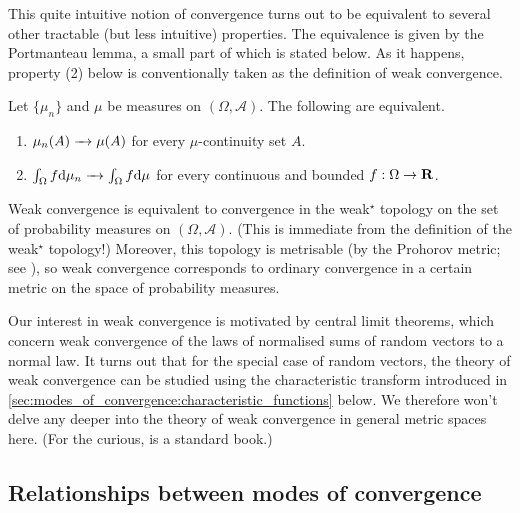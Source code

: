 \documentclass[11pt,letterpaper,reqno,oneside]{article}
\begin{document}
This quite intuitive notion of convergence turns out to be equivalent to several other tractable (but less intuitive) properties. The equivalence is given by the Portmanteau lemma, a small part of which is stated below. As it happens, property (2) below is conventionally taken as the definition of weak convergence.
%
\begin{lemma}
	\label{lemma:Portmanteau}
	Let $\{\mu_n\}$ and $\mu$ be measures on $(\Omega,\mathcal{A})$. The following are equivalent.
	\begin{enumerate}

		\item $\mu_n(A) \xrightarrow{\;\;\;} \mu(A)$ for every $\mu$-continuity set $A$.

		\item $\int_\Omega f \mathrm{d} \mu_n \xrightarrow{\;\;\;} \int_\Omega f \mathrm{d} \mu$ for every continuous and bounded $f : \Omega \to \mathbf{R}$.

	\end{enumerate}
\end{lemma}


Weak convergence is equivalent to convergence in the weak$^\star$ topology on the set of probability measures on $(\Omega,\mathcal{A})$. (This is immediate from the definition of the weak$^\star$ topology!) Moreover, this topology is metrisable (by the Prohorov metric; see \textcite[][pp. 72--3]{Billingsley1999}), so weak convergence corresponds to ordinary convergence in a certain metric on the space of probability measures.

Our interest in weak convergence is motivated by central limit theorems, which concern weak convergence of the laws of normalised sums of random vectors to a normal law. It turns out that for the special case of random vectors, the theory of weak convergence can be studied using the characteristic transform introduced in \cref{sec:modes_of_convergence:characteristic_functions} below. We therefore won't delve any deeper into the theory of weak convergence in general metric spaces here. (For the curious, \textcite{Billingsley1999} is a standard book.)



\subsection{Relationships between modes of convergence}
\label{sec:modes_of_convergence:relationships}
\end{document}

